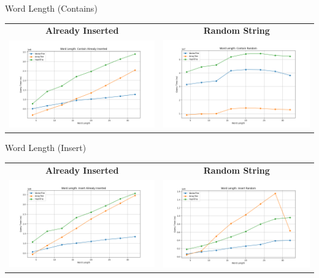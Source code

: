 \documentclass{beamer}
\begin{document}
    \begin{frame}{Word Length (Contains)}
        \begin{center}
            \begin{tabular}{cc}
                \textbf{Already Inserted} & \textbf{Random String} \\
                \includegraphics[width=0.48\linewidth]{plot_word_length/plot_word_length_contain_already_inserted} &
                \includegraphics[width=0.48\linewidth]{plot_word_length/plot_word_length_contain_random} \\
            \end{tabular}
        \end{center}
    \end{frame}

    \begin{frame}{Word Length (Insert)}
        \begin{center}
            \begin{tabular}{cc}
                \textbf{Already Inserted} & \textbf{Random String} \\
                \includegraphics[width=0.48\linewidth]{plot_word_length/plot_word_length_insert_already_inserted} &
                \includegraphics[width=0.48\linewidth]{plot_word_length/plot_word_length_insert_random} \\
            \end{tabular}
        \end{center}
    \end{frame}
\end{document}
